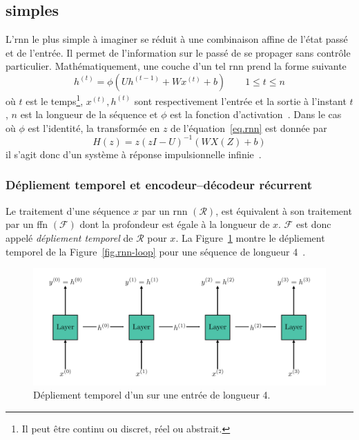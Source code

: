 \subsection{ simples}

L'\gls{rnn} le plus simple à imaginer se réduit à une combinaison affine de l'état passé et de l'entrée.
Il permet de l'information sur le passé de se propager sans contrôle particulier.
Mathématiquement, une couche d'un tel \gls{rnn} prend la forme suivante
\begin{equation}
    \label{eq.rnn}
    h^{(t)} = \phi\left(Uh^{(t-1)} + Wx^{(t)} + b\right) \qquad 1 \le t \le n
\end{equation}
où \(t\) est le temps\footnote{Il peut être continu ou discret, réel ou abstrait.},
\(x^{(t)}, h^{(t)}\) sont respectivement l'entrée et la sortie à l'instant \(t\), 
\(n\) est la longueur de la séquence et \(\phi\) est la fonction d'activation~\cite{Fathi_2021}.
Dans le cas où \(\phi\) est l'identité,  
la transformée en \(z\) de l'équation~\ref{eq.rnn} est donnée par 
\begin{equation}
    \label{eq.rnn-tz}
    H(z) = z\left(zI - U\right)^{-1} \left(WX(Z) + b\right)
\end{equation}
il s'agit donc d'un système à réponse impulsionnelle infinie~\cite{Fathi_2021}.

\subsubsection{Dépliement temporel et encodeur--décodeur récurrent}

Le traitement d'une séquence \(x\) par un \gls{rnn} \((\mathcal{R})\), 
est équivalent à son traitement par un \gls{ffn} \((\mathcal{F})\) dont la profondeur est égale à la longueur de \(x\).
\(\mathcal{F}\) est donc appelé \emph{dépliement temporel} de \(\mathcal{R}\) pour \(x\).
La Figure~\ref{fig.rnn-unfold} montre le dépliement temporel de la Figure~\ref{fig.rnn-loop} 
pour une séquence de longueur 4~\cite{LeCun_Bengio_Hinton_2015}.

\begin{figure}[hbt]
    \centering
    \includegraphics[width=\textwidth]{assets/images/rnn-unfolding.png}
    \caption{Dépliement temporel d'un  sur une entrée de longueur 4.}
    \label{fig.rnn-unfold}
\end{figure}

